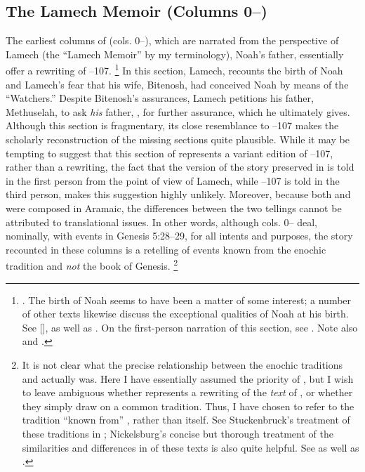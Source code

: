 \subsection{The Lamech Memoir (Columns 0--)}
The earliest columns of \ga (cols. 0--), which are narrated from the perspective of Lamech (the ``Lamech Memoir'' by my terminology), Noah's father, essentially offer a rewriting of --107.%
    \footnote{\Cite[174]{nickelsburg2005}. The birth of Noah seems to have been a matter of some interest; a number of other texts likewise discuss the exceptional qualities of Noah at his birth. See [],  as well as \cite{vanderkam_kapera1992}. On the first-person narration of this section, see \cite{weigold_as2010}. Note also \cite{stuckenbruck_berthelot-etal2010} and \cite{baxter_jsp2006}.}
In this section, Lamech, recounts the birth of Noah and Lamech's fear that his wife, Bitenosh, had conceived Noah by means of the  ``Watchers.'' Despite Bitenosh's assurances, Lamech petitions his father, Methuselah, to ask \emph{his} father, \enoch, for further assurance, which he ultimately gives. Although this section is fragmentary, its close resemblance to --107 makes the scholarly reconstruction of the missing sections quite plausible. While it may be tempting to suggest that this section of \ga represents a variant edition of --107, rather than a rewriting, the fact that the version of the story preserved in \ga is told in the first person from the point of view of Lamech, while --107 is told in the third person, makes this suggestion highly unlikely. Moreover, because both \firstenoch and \ga were composed in Aramaic, the differences between the two tellings cannot be attributed to translational issues. In other words, although cols. 0-- deal, nominally, with events in Genesis 5:28--29, for all intents and purposes, the story recounted in these columns is a retelling of events known from the enochic tradition and \emph{not} the book of Genesis.%
    \footnote{It is not clear what the precise relationship between the enochic traditions and \ga actually was. Here I have essentially assumed the priority of \firstenoch, but I wish to leave ambiguous whether \ga represents a rewriting of the \emph{text} of \firstenoch, or whether they simply draw on a common tradition. Thus, I have chosen to refer to the tradition ``known from'' \firstenoch, rather than \firstenoch itself. See Stuckenbruck's treatment of these traditions in \cite*{stuckenbruck_berthelot-etal2010}; Nickelsburg's concise but thorough treatment of the similarities and differences in of these texts is also quite helpful. See \cite[173--174]{nickelsburg2005} as well as \cite[122--123]{fitzmyer2004}.} 


